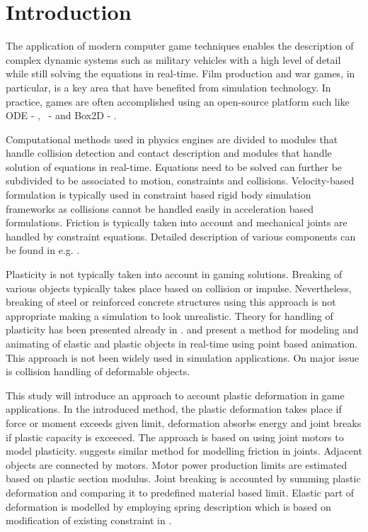 \section{Introduction}

The application of modern computer game techniques enables the description of complex dynamic systems 
such as military vehicles with a high level of detail while still solving the equations in real-time.
Film production and war games, in particular, is a key area that have benefited from simulation technology. 
In practice, games are often accomplished using an open-source platform such 
like ODE - \cite{ode}, \bullet\ - \cite{bullet} and Box2D - \cite{box2d}.

Computational methods used in physics engines are divided to modules that handle collision detection and 
contact description and modules that handle solution of equations in real-time. Equations need to be 
solved can further be subdivided to be associated to motion, constraints and collisions. 
Velocity-based formulation is typically used in constraint based rigid body simulation 
frameworks as collisions cannot be handled easily in acceleration based formulations. 
Friction is typically taken into account and mechanical joints are handled by constraint equations.
Detailed description of various components can be found in e.g. \cite{erleben.thesis}.

Plasticity is not typically taken into account in gaming solutions. 
Breaking of various objects typically takes place based on collision or impulse.
Nevertheless, breaking of steel or reinforced concrete structures using this approach 
is not appropriate making a simulation to look unrealistic. Theory for handling of plasticity 
has been presented already in \cite{cg1988}. \cite{muller2004point} and \cite{muller2005meshless} 
present a method for modeling and animating of elastic and plastic objects in real-time using 
point based animation. This approach is not been widely used in simulation applications.  
On major issue is collision handling of deformable objects.

This study will introduce an approach to account plastic deformation in game applications.   
In the introduced method, the plastic deformation takes place if force or moment exceeds given 
limit, deformation absorbs energy and joint breaks if plastic capacity is exceeced. 
The approach is based on using joint motors to model plasticity. \cite[p.~90]{erleben.thesis} 
suggests similar method for modelling friction in joints. Adjacent objects are connected by motors. 
Motor power production limits are estimated based on plastic section modulus. 
Joint breaking is accounted by summing plastic deformation and comparing it to 
predefined material based limit. Elastic part of deformation is modelled by employing 
spring description which is based on modification of existing constraint in \bullet.

